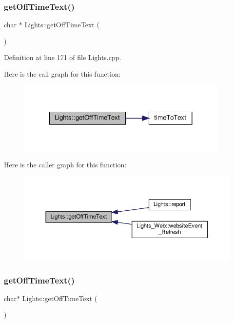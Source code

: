 \subsubsection{\texorpdfstring{get\+Off\+Time\+Text()}{getOffTimeText()}\hspace{0.1cm}{\footnotesize\ttfamily [1/2]}}
{\footnotesize\ttfamily char $\ast$ Lights\+::get\+Off\+Time\+Text (\begin{DoxyParamCaption}{ }\end{DoxyParamCaption})}



Definition at line 171 of file Lights.\+cpp.

Here is the call graph for this function\+:
\nopagebreak
\begin{figure}[H]
\begin{center}
\leavevmode
\includegraphics[width=299pt]{class_lights_afa7da12d1c3c6646a547220f34c90bd3_cgraph}
\end{center}
\end{figure}
Here is the caller graph for this function\+:
\nopagebreak
\begin{figure}[H]
\begin{center}
\leavevmode
\includegraphics[width=350pt]{class_lights_afa7da12d1c3c6646a547220f34c90bd3_icgraph}
\end{center}
\end{figure}
\mbox{\label{class_lights_a03976471c6435ee329690da54224360b}} 
\subsubsection{\texorpdfstring{get\+Off\+Time\+Text()}{getOffTimeText()}\hspace{0.1cm}{\footnotesize\ttfamily [2/2]}}
{\footnotesize\ttfamily char$\ast$ Lights\+::get\+Off\+Time\+Text (\begin{DoxyParamCaption}{ }\end{DoxyParamCaption})}

